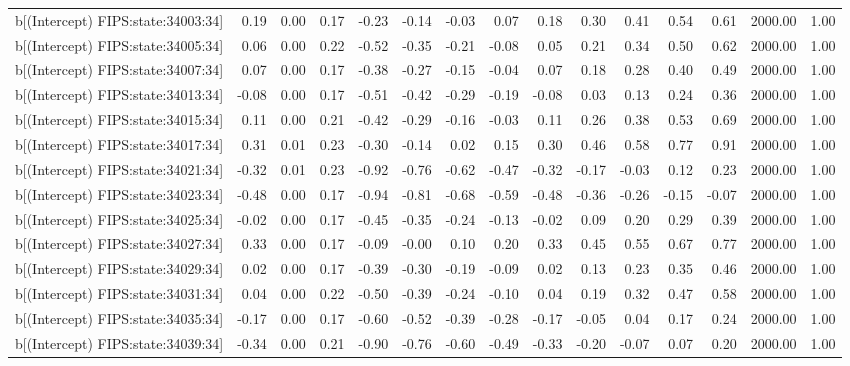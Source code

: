 \begin{table}[ht]
\begin{tabular}{rrrrrrrrrrrrrrr}
  b[(Intercept) FIPS:state:34003:34] & 0.19 & 0.00 & 0.17 & -0.23 & -0.14 & -0.03 & 0.07 & 0.18 & 0.30 & 0.41 & 0.54 & 0.61 & 2000.00 & 1.00 \\ 
  b[(Intercept) FIPS:state:34005:34] & 0.06 & 0.00 & 0.22 & -0.52 & -0.35 & -0.21 & -0.08 & 0.05 & 0.21 & 0.34 & 0.50 & 0.62 & 2000.00 & 1.00 \\ 
  b[(Intercept) FIPS:state:34007:34] & 0.07 & 0.00 & 0.17 & -0.38 & -0.27 & -0.15 & -0.04 & 0.07 & 0.18 & 0.28 & 0.40 & 0.49 & 2000.00 & 1.00 \\ 
  b[(Intercept) FIPS:state:34013:34] & -0.08 & 0.00 & 0.17 & -0.51 & -0.42 & -0.29 & -0.19 & -0.08 & 0.03 & 0.13 & 0.24 & 0.36 & 2000.00 & 1.00 \\ 
  b[(Intercept) FIPS:state:34015:34] & 0.11 & 0.00 & 0.21 & -0.42 & -0.29 & -0.16 & -0.03 & 0.11 & 0.26 & 0.38 & 0.53 & 0.69 & 2000.00 & 1.00 \\ 
  b[(Intercept) FIPS:state:34017:34] & 0.31 & 0.01 & 0.23 & -0.30 & -0.14 & 0.02 & 0.15 & 0.30 & 0.46 & 0.58 & 0.77 & 0.91 & 2000.00 & 1.00 \\ 
  b[(Intercept) FIPS:state:34021:34] & -0.32 & 0.01 & 0.23 & -0.92 & -0.76 & -0.62 & -0.47 & -0.32 & -0.17 & -0.03 & 0.12 & 0.23 & 2000.00 & 1.00 \\ 
  b[(Intercept) FIPS:state:34023:34] & -0.48 & 0.00 & 0.17 & -0.94 & -0.81 & -0.68 & -0.59 & -0.48 & -0.36 & -0.26 & -0.15 & -0.07 & 2000.00 & 1.00 \\ 
  b[(Intercept) FIPS:state:34025:34] & -0.02 & 0.00 & 0.17 & -0.45 & -0.35 & -0.24 & -0.13 & -0.02 & 0.09 & 0.20 & 0.29 & 0.39 & 2000.00 & 1.00 \\ 
  b[(Intercept) FIPS:state:34027:34] & 0.33 & 0.00 & 0.17 & -0.09 & -0.00 & 0.10 & 0.20 & 0.33 & 0.45 & 0.55 & 0.67 & 0.77 & 2000.00 & 1.00 \\ 
  b[(Intercept) FIPS:state:34029:34] & 0.02 & 0.00 & 0.17 & -0.39 & -0.30 & -0.19 & -0.09 & 0.02 & 0.13 & 0.23 & 0.35 & 0.46 & 2000.00 & 1.00 \\ 
  b[(Intercept) FIPS:state:34031:34] & 0.04 & 0.00 & 0.22 & -0.50 & -0.39 & -0.24 & -0.10 & 0.04 & 0.19 & 0.32 & 0.47 & 0.58 & 2000.00 & 1.00 \\ 
  b[(Intercept) FIPS:state:34035:34] & -0.17 & 0.00 & 0.17 & -0.60 & -0.52 & -0.39 & -0.28 & -0.17 & -0.05 & 0.04 & 0.17 & 0.24 & 2000.00 & 1.00 \\ 
  b[(Intercept) FIPS:state:34039:34] & -0.34 & 0.00 & 0.21 & -0.90 & -0.76 & -0.60 & -0.49 & -0.33 & -0.20 & -0.07 & 0.07 & 0.20 & 2000.00 & 1.00 \\ 

\end{tabular}
\end{table}
